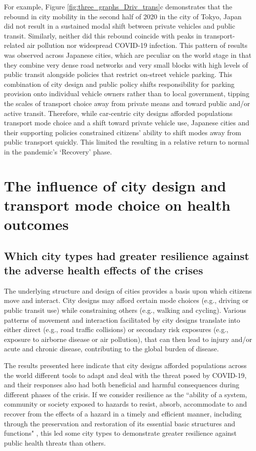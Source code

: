 \documentclass[preprint,10pt]{elsarticle} %
\begin{document}
For example, Figure \ref{fig:three_graphs_Driv_trans}c demonstrates that the rebound in city mobility in the second half of 2020 in the city of Tokyo, Japan did not result in a sustained modal shift between private vehicles and public transit. Similarly, neither did this rebound coincide with peaks in transport-related air pollution nor widespread COVID-19 infection. This pattern of results was observed across Japanese cities, which are peculiar on the world stage in that they combine very dense road networks and very small blocks with high levels of public transit alongside policies that restrict on-street vehicle parking\cite{clements2019socialising}. This combination of city design and public policy shifts responsibility for parking provision onto individual vehicle owners rather than to local government, tipping the scales of transport choice away from private means and toward public and/or active transit. Therefore, while car-centric city designs afforded populations transport mode choice and a shift toward private vehicle use, Japanese cities and their supporting policies constrained citizens' ability to shift modes away from public transport quickly. This limited the  resulting in a relative return to normal in the pandemic's `Recovery' phase.


\section*{\textcolor{OliveGreen}{The influence of city design and transport mode choice on health outcomes}}
\subsection*{Which city types had greater resilience against the adverse health effects of the crises}
The underlying structure and design of cities provides a basis upon which citizens move and interact. City designs may afford certain mode choices (e.g., driving or public transit use) while constraining others (e.g., walking and cycling). Various patterns of movement and interaction facilitated by city designs translate into either direct (e.g., road traffic collisions) or secondary risk exposures (e.g., exposure to airborne disease or air pollution), that can then lead to injury and/or acute and chronic disease, contributing to the global burden of disease.

The results presented here indicate that city designs afforded populations across the world different tools to adapt and deal with the threat posed by COVID-19, and their responses also had both beneficial and harmful consequences during different phases of the crisis. If we consider resilience as the ``ability of a system, community or society exposed to hazards to resist, absorb, accommodate to and recover from the effects of a hazard in a timely and efficient manner, including through the preservation and restoration of its essential basic structures and functions" \cite{unisdr2009terminology}, this led some city types to demonstrate greater resilience against public health threats than others.
\end{document}
